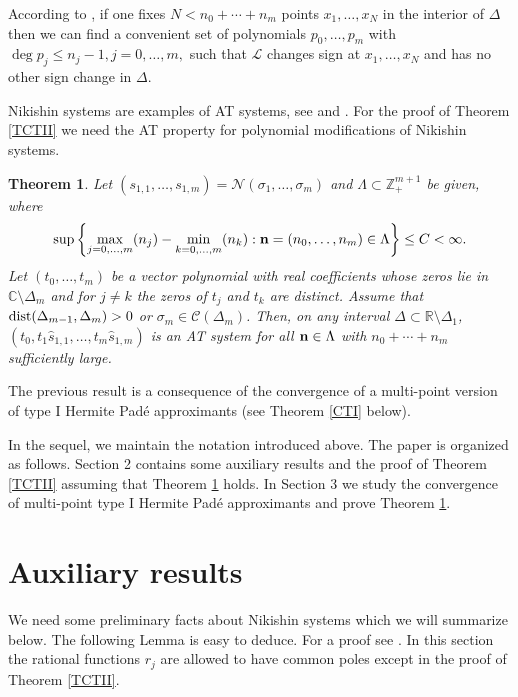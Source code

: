 \documentclass[10pt,a4paper]{article}
\newtheorem{theorem}{Theorem}[section]
\theoremstyle{definition}
\theoremstyle{remark}
\numberwithin{equation}{section}
\begin{document}
According to \cite[Theorem 1.1]{KN}, if one fixes  $N < n_0+\cdots+n_m$ points $x_1,\ldots,x_N$ in the interior of $\Delta$ then we can find a convenient set of polynomials $p_0,\ldots,p_m$ with $\deg p_j \leq n_j -1, j=0,\ldots,m,$ such that $ {\mathcal{L}}$ changes sign at $x_1,\ldots,x_N$ and has no other sign change  in $\Delta.$

Nikishin systems are examples of AT systems, see \cite[Theorem 1.1]{FL4} and \cite[Theorem 1.1]{FL4II}. For the proof of Theorem \ref{TCTII} we need the AT property for polynomial modifications of Nikishin systems.

\begin{theorem}\label{teoAT}
Let $(s_{1,1},\ldots, s_{1,m})= \mathcal{N}(\sigma_{1},\ldots, \sigma_{m})$ and $\Lambda \subset \mathbb{Z}_+^{m+1}$ be given, where
\begin{equation}\label{cond3} \sup \left\{\max_{j=0,\ldots,m}(n_j) - \min_{k=0,\ldots,m}(n_k) : {\bf n} =(n_0,\ldots,n_m) \in \Lambda\right\} \leq C < \infty.
\end{equation}
Let $(t_{0},\ldots,t_{m})$ be a vector  polynomial with real coefficients whose zeros lie in $\mathbb{C}\setminus \Delta_{m}$ and for $j\neq k$ the zeros of $t_j$ and $t_k$ are distinct. Assume that $\mbox{\rm dist}(\Delta_{m-1},\Delta_m) > 0$  or $\sigma_m \in \mathcal{C}(\Delta_m)$. Then, on any interval $\Delta\subset \mathbb{R}\setminus \Delta_{1}$, $(t_0,t_1\hat{s}_{1,1}, \ldots, t_m\hat{s}_{1,m})$ is an AT system  for all ${\bf n} \in \Lambda$ with $n_0+\cdots+n_m$ sufficiently large.
\end{theorem}

The previous result is a consequence of the convergence of a multi-point version of type I Hermite Pad\'e approximants (see Theorem \ref{CTI} below).

In the sequel,   we maintain the notation introduced above.  The paper is organized as follows. Section 2 contains some auxiliary results and the proof of Theorem
\ref{TCTII} assuming that Theorem \ref{teoAT} holds. In Section 3 we study the convergence of multi-point type I Hermite Pad\'e approximants and prove Theorem \ref{teoAT}.

\section{Auxiliary results}

We need some preliminary facts about Nikishin systems which we will summarize below.
The following Lemma is easy to deduce. For a proof see \cite[Lemma 2.1]{LS}. In this section the  rational functions $r_j$ are allowed to have common poles except in the proof of Theorem \ref{TCTII}.
\end{document}
